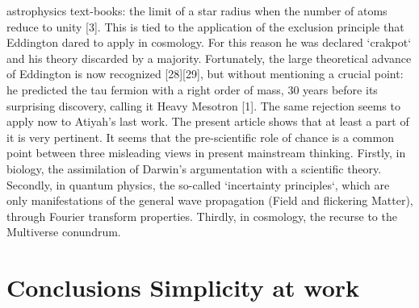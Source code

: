 \documentclass[twoside,draft]{article}
\begin{document}
\begin{sloppypar}
{astrophysics text-books: the limit of a star radius when the number of atoms reduce to unity [3].
This is tied to the application of the exclusion principle that Eddington dared to apply in
cosmology. For this reason he was declared `crakpot` and his theory discarded by a majority.
Fortunately, the large theoretical advance of Eddington is now recognized [28][29], but without
mentioning a crucial point: he predicted the tau fermion with a right order of mass, 30 years before its surprising discovery, calling it Heavy Mesotron [1].
The same rejection seems to apply now to Atiyah's last work. The present article shows that at
least a part of it is very pertinent.
It seems that the pre-scientific role of chance is a common point between three misleading views
in present mainstream thinking. Firstly, in biology, the assimilation of Darwin's argumentation
with a scientific theory. Secondly, in quantum physics, the so-called `incertainty principles`, which are
only manifestations of the general wave propagation (Field and flickering Matter), through Fourier
transform properties. Thirdly, in cosmology, the recurse to the Multiverse conundrum.


\section {Conclusions Simplicity at work}

}
\end{sloppypar}
\end{document}
